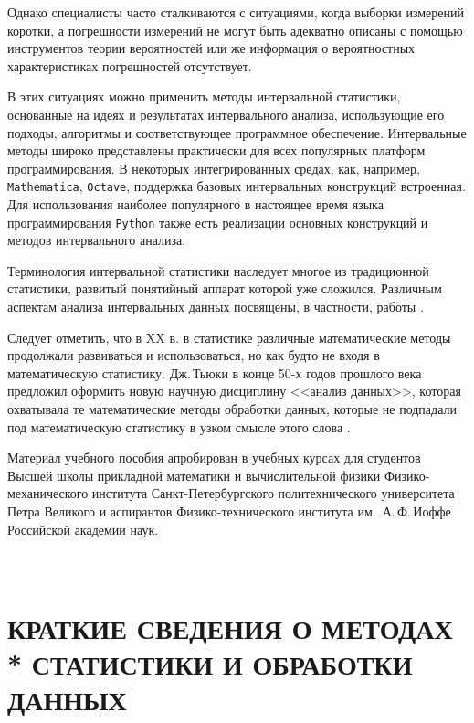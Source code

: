 \documentclass[a5paper,openany]{book}
\begin{document}
{Однако специалисты часто сталкиваются с ситуациями, когда выборки 
измерений коротки, а погрешности 
измерений не могут быть адекватно описаны с помощью инструментов теории вероятностей 
или же информация о вероятностных характеристиках погрешностей отсутствует. 

В этих ситуациях можно применить методы интервальной статистики, основанные на идеях и результатах интервального анализа, использующие его подходы, алгоритмы и соответствующее программное обеспечение. 
Интервальные методы широко представлены практически для всех популярных платформ программирования. В некоторых интегрированных средах, как, например, {\tt Mathematica}, {\tt Octave}, поддержка базовых интервальных конструкций встроенная.   
Для использования наиболее популярного в настоящее время языка программирования {\tt Python} также есть реализации основных конструкций и методов интервального анализа. 

Терминология интервальной 
статистики наследует 
многое из традиционной статистики,  развитый понятийный аппарат которой уже сложился. 
Различным аспектам анализа интервальных данных посвящены, в частности,  работы \cite{SSharyJCT2017, Kumkov2013, NguyenKreinWuXiang}.

Следует отметить, что в XX в. в статистике различные математические методы  продолжали развиваться и использоваться, но как будто не входя в математическую статистику. Дж.\,Тьюки в конце 50-х годов прошлого века предложил оформить 
новую научную дисциплину <<анализ данных>>, которая 
охватывала те математические методы обработки данных, которые не подпадали 
под математическую статистику в узком смысле этого слова \cite{Tukey1962}.


Материал учебного пособия апробирован в учебных курсах для студентов  
Высшей школы прикладной математики и вычислительной физики
 Физико-механического института Санкт-Петербургского политехнического университета Петра Великого
 и аспирантов Физико-технического института им.~А.\,Ф.\,Иоффе Российской академии наук.
 


	\chapter[Краткие сведения о методах статистики и обработки данных]%
{\\КРАТКИЕ СВЕДЕНИЯ О МЕТОДАХ \\* СТАТИСТИКИ И ОБРАБОТКИ ДАННЫХ} 

}
\end{document}
